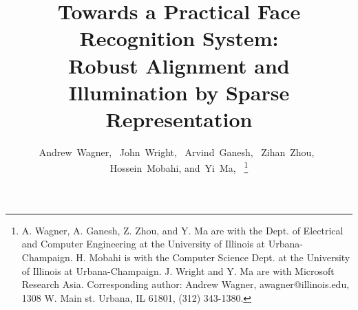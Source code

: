\documentclass[10pt,journal,letterpaper,compsoc]{IEEEtran} %
\begin{document}
%
\title{Towards a Practical Face Recognition System: \\ Robust Alignment and
Illumination by Sparse Representation}
%
\author{Andrew~Wagner,~
        John~Wright,~
        Arvind~Ganesh,~
        Zihan~Zhou,~
        Hossein~Mobahi,
        and~Yi~Ma,~%
\thanks{A. Wagner, A. Ganesh, Z. Zhou, and Y. Ma are with the Dept. of Electrical and Computer Engineering at the University of Illinois at Urbana-Champaign. H. Mobahi is with the Computer Science Dept. at the University of Illinois at Urbana-Champaign.  J. Wright and Y. Ma are with Microsoft Research Asia.  Corresponding author: Andrew Wagner, awagner@illinois.edu, 1308 W. Main st. Urbana, IL 61801, (312) 343-1380.}}%






\end{document}

